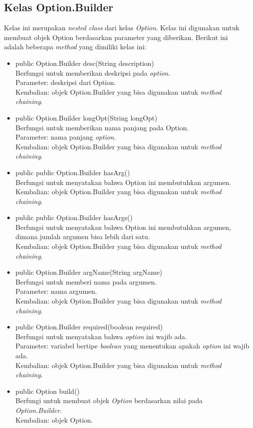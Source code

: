 \subsection{Kelas Option.Builder}
\label{subsec:optionbuilder}
Kelas ini merupakan \textit{nested class} dari kelas \textit{Option}. Kelas ini digunakan untuk membuat objek Option berdasarkan parameter yang diberikan. Berikut ini adalah beberapa \textit{method} yang dimiliki kelas ini: 
\begin{itemize}
\item public Option.Builder desc(String description)\\
Berfungsi untuk memberikan deskripsi pada \textit{option}.\\
Parameter: deskripsi dari Option.\\
Kembalian: objek Option.Builder yang bisa digunakan untuk \textit{method chaining}.

\item public Option.Builder longOpt(String longOpt)\\
Berfungsi untuk memberikan nama panjang pada Option.\\
Parameter: nama panjang \textit{option}.\\
Kembalian: objek Option.Builder yang bisa digunakan untuk \textit{method chaining}.

\item public public Option.Builder hasArg()\\
Berfungsi untuk menyatakan bahwa Option ini membutuhkan argumen.\\
Kembalian: objek Option.Builder yang bisa digunakan untuk \textit{method chaining}.

\item public public Option.Builder hasArgs()\\
Berfungsi untuk menyatakan bahwa Option ini membutuhkan argumen, dimana jumlah argumen bisa lebih dari satu.\\
Kembalian: objek Option.Builder yang bisa digunakan untuk \textit{method chaining}.

\item public Option.Builder argName(String argName)\\
Berfungsi untuk memberi nama pada argumen.\\
Parameter: nama argumen.\\
Kembalian: objek Option.Builder yang bisa digunakan untuk \textit{method chaining}.

\item public Option.Builder required(boolean required)\\
Berfungsi untuk menyatakan bahwa \textit{option} ini wajib ada.\\
Parameter: variabel bertipe \textit{boolean} yang menentukan apakah \textit{option} ini wajib ada.\\
Kembalian: objek Option.Builder yang bisa digunakan untuk \textit{method chaining}.

\item public Option build()\\
Berfungi untuk membuat objek \textit{Option} berdasarkan nilai pada \textit{Option.Builder}.\\
Kembalian: objek Option.

\end{itemize}



